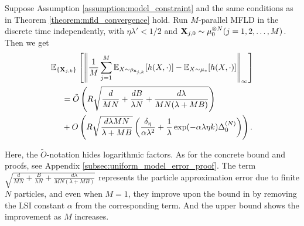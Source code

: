 \begin{theorem}\label{theorem:uniform_approximation_multiple_mfld}
    Suppose Assumption \ref{assumption:model_constraint} and the same conditions as in Theorem \ref{theorem:mfld_convergence} hold. Run $M$-parallel MFLD in the discrete time independently, with $\eta \lambda' < 1/2$ and $\vX_{j,0} \sim \tensor[\mu,N]_0 (j=1,2,\ldots,M)$. Then we get
    \begin{align*}
        &\bE_{\{\vX_{j,k}\}}\left[\left\| \frac{1}{M}\sum_{j=1}^M \bE_{X\sim \rho_{\vx_{j,k}}}[h(X,\cdot)] - \bE_{X\sim \mu_*} [h(X,\cdot)]\right\|_\infty\right] \\
        &~~~~=\tilde{O}\left( R\sqrt{\frac{d}{MN} + \frac{dB}{\lambda N}
        + \frac{d\lambda}{MN(\lambda + MB)}} \right) \\
        &~~~~+ O\left( R\sqrt{\frac{d\lambda M N}{\lambda + MB}} \left(\frac{ \delta_{\eta}}{\alpha\lambda^2} 
        + \frac{1}{\lambda}\exp( -\alpha\lambda\eta k )\pow[\Delta,N]_0 \right) \right).
    \end{align*}
\end{theorem}
Here, the $\tilde{O}$-notation hides logarithmic factors. As for the concrete bound and proofs, see Appendix \ref{subsec:uniform_model_error_proof}. The term $\sqrt{\frac{d}{MN} + \frac{B}{\lambda N} + \frac{d\lambda}{MN(\lambda + MB)}}$ represents the particle approximation error due to finite $N$ particles, and even when $M=1$, they improve upon the bound in \citet{suzuki2023convergence,suzuki2023featurelearning} by removing the LSI constant $\alpha$ from the corresponding term. And the upper bound shows the improvement as $M$ increases.

